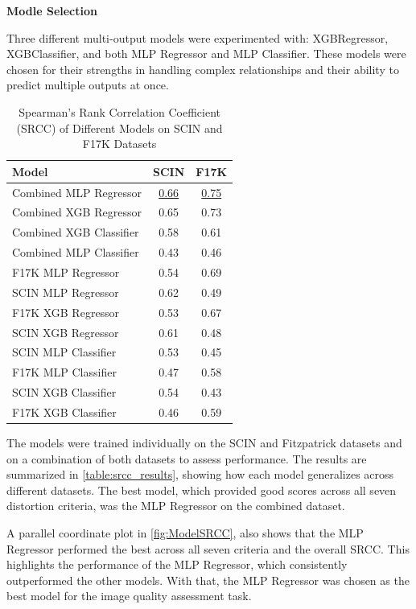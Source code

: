 \noindent
\textbf{Modle Selection} \par
\noindent
Three different multi-output models were experimented with: XGBRegressor, XGBClassifier, and both MLP Regressor and MLP Classifier. These models were chosen for their strengths in handling complex relationships and their ability to predict multiple outputs at once. \par
\vspace{\baselineskip}
\begin{table}[h]
    \centering
    \begin{tabular}{|l|c|c|}
        \hline
        \textbf{Model} & \textbf{SCIN} & \textbf{F17K} \\
        \hline
        Combined MLP Regressor & \underline{0.66} & \underline{0.75} \\
        Combined XGB Regressor & 0.65 & 0.73 \\
        Combined XGB Classifier & 0.58 & 0.61 \\
        Combined MLP Classifier & 0.43 & 0.46 \\
        \hline
        F17K MLP Regressor & 0.54 & 0.69 \\
        SCIN MLP Regressor & 0.62 & 0.49 \\
        F17K XGB Regressor & 0.53 & 0.67 \\
        SCIN XGB Regressor & 0.61 & 0.48 \\
        SCIN MLP Classifier & 0.53 & 0.45 \\
        F17K MLP Classifier & 0.47 & 0.58 \\
        SCIN XGB Classifier & 0.54 & 0.43 \\
        F17K XGB Classifier & 0.46 & 0.59 \\
        \hline
    \end{tabular}
    \caption{Spearman's Rank Correlation Coefficient (SRCC) of Different Models on SCIN and F17K Datasets}
    \label{table:srcc_results}
\end{table}

\noindent
The models were trained individually on the SCIN and Fitzpatrick datasets and on a combination of both datasets to assess performance. The results are summarized in \autoref{table:srcc_results}, showing how each model generalizes across different datasets. The best model, which provided good scores across all seven distortion criteria, was the MLP Regressor on the combined dataset. \par
\vspace{\baselineskip}
\noindent
A parallel coordinate plot in \autoref{fig:ModelSRCC}, also shows that the MLP Regressor performed the best across all seven criteria and the overall SRCC. This highlights the performance of the MLP Regressor, which consistently outperformed the other models. With that, the MLP Regressor was chosen as the best model for the image quality assessment task.

